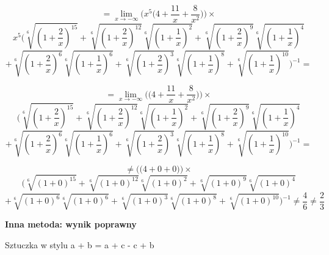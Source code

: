 \documentclass{article}
\begin{document}
\begin{equation*}
    = \lim_{x \to - \infty} \Bigg(x^{5} \Big(4 + \frac{11}{x} + \frac{8}{x^2}\Big)\Bigg) \times %
\end{equation*}
\begin{equation*}
    x^{5}\Bigg(\sqrt[6]{(1 + \frac{2}{x})^{15}} + \sqrt[6]{(1 + \frac{2}{x})^{12}}\sqrt[6]{(1 + \frac{1}{x})^{2}}  + \sqrt[6]{(1 + \frac{2}{x})^{9}}\sqrt[6]{(1 + \frac{1}{x})^{4}}
\end{equation*}
\begin{equation*}
    +  \sqrt[6]{(1 + \frac{2}{x})^{6}}\sqrt[6]{(1 + \frac{1}{x})^{6}} + \sqrt[6]{(1 + \frac{2}{x})^{3}}\sqrt[6]{(1 + \frac{1}{x})^{8}} + \sqrt[6]{(1 + \frac{1}{x})^{10}}\Bigg)^{-1} = 
\end{equation*}

\begin{equation*}
    = \lim_{x \to - \infty} \Bigg(\Big(4 + \frac{11}{x} + \frac{8}{x^2}\Big)\Bigg) \times %
\end{equation*}
\begin{equation*}
    \Bigg(\sqrt[6]{(1 + \frac{2}{x})^{15}} + \sqrt[6]{(1 + \frac{2}{x})^{12}}\sqrt[6]{(1 + \frac{1}{x})^{2}}  + \sqrt[6]{(1 + \frac{2}{x})^{9}}\sqrt[6]{(1 + \frac{1}{x})^{4}}
\end{equation*}
\begin{equation*}
    +  \sqrt[6]{(1 + \frac{2}{x})^{6}}\sqrt[6]{(1 + \frac{1}{x})^{6}} + \sqrt[6]{(1 + \frac{2}{x})^{3}}\sqrt[6]{(1 + \frac{1}{x})^{8}} + \sqrt[6]{(1 + \frac{1}{x})^{10}}\Bigg)^{-1} = 
\end{equation*}

\begin{equation*}
    \neq \Bigg(\Big(4 + 0 + 0\Big)\Bigg) \times %
\end{equation*}
\begin{equation*}
    \Bigg(\sqrt[6]{(1 + 0)^{15}} + \sqrt[6]{(1 + 0)^{12}}\sqrt[6]{(1 + 0)^{2}}  + \sqrt[6]{(1 + 0)^{9}}\sqrt[6]{(1 + 0)^{4}}
\end{equation*}
\begin{equation*}
    +  \sqrt[6]{(1 + 0)^{6}}\sqrt[6]{(1 + 0)^{6}} + \sqrt[6]{(1 + 0)^{3}}\sqrt[6]{(1 + 0)^{8}} + \sqrt[6]{(1 + 0)^{10}}\Bigg)^{-1} \neq \frac{4}{6} \neq \frac{2}{3}
\end{equation*}

\textbf{Inna metoda: wynik poprawny}

\begin{center}
    Sztuczka w stylu a + b = a + c - c + b
\end{center}
\end{document}
